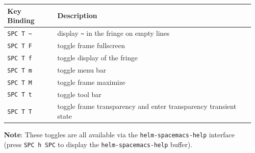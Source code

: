 \documentclass[11pt]{article}
\begin{document}
\begin{center}
\begin{tabular}{ll}
Key Binding & Description\\
\hline
\texttt{SPC T \textasciitilde{}} & display \texttt{\textasciitilde{}} in the fringe on empty lines\\
\texttt{SPC T F} & toggle frame fullscreen\\
\texttt{SPC T f} & toggle display of the fringe\\
\texttt{SPC T m} & toggle menu bar\\
\texttt{SPC T M} & toggle frame maximize\\
\texttt{SPC T t} & toggle tool bar\\
\texttt{SPC T T} & toggle frame transparency and enter transparency transient state\\
\end{tabular}
\end{center}

\textbf{Note}: These toggles are all available via the \texttt{helm-spacemacs-help} interface
(press \texttt{SPC h SPC} to display the \texttt{helm-spacemacs-help} buffer).
\end{document}
